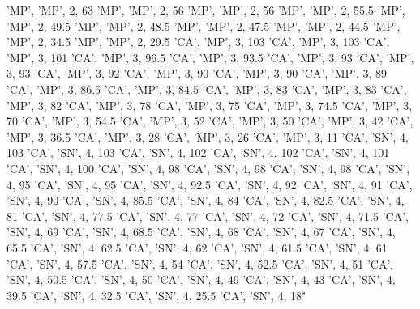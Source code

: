 \documentclass[
]{article}
\newenvironment{Shaded}{\begin{snugshade}}{\end{snugshade}}
\newcommand{\StringTok}[1]{\textcolor[rgb]{0.31,0.60,0.02}{#1}}
\begin{document}
\begin{Shaded}
\begin{Highlighting}[]
\StringTok{ 'MP', 'MP', 2, 63}
\StringTok{ 'MP', 'MP', 2, 56}
\StringTok{ 'MP', 'MP', 2, 56}
\StringTok{ 'MP', 'MP', 2, 55.5}
\StringTok{ 'MP', 'MP', 2, 49.5}
\StringTok{ 'MP', 'MP', 2, 48.5}
\StringTok{ 'MP', 'MP', 2, 47.5}
\StringTok{ 'MP', 'MP', 2, 44.5}
\StringTok{ 'MP', 'MP', 2, 34.5}
\StringTok{ 'MP', 'MP', 2, 29.5}
\StringTok{ 'CA', 'MP', 3, 103}
\StringTok{ 'CA', 'MP', 3, 103}
\StringTok{ 'CA', 'MP', 3, 101}
\StringTok{ 'CA', 'MP', 3, 96.5}
\StringTok{ 'CA', 'MP', 3, 93.5}
\StringTok{ 'CA', 'MP', 3, 93}
\StringTok{ 'CA', 'MP', 3, 93}
\StringTok{ 'CA', 'MP', 3, 92}
\StringTok{ 'CA', 'MP', 3, 90}
\StringTok{ 'CA', 'MP', 3, 90}
\StringTok{ 'CA', 'MP', 3, 89}
\StringTok{ 'CA', 'MP', 3, 86.5}
\StringTok{ 'CA', 'MP', 3, 84.5}
\StringTok{ 'CA', 'MP', 3, 83}
\StringTok{ 'CA', 'MP', 3, 83}
\StringTok{ 'CA', 'MP', 3, 82}
\StringTok{ 'CA', 'MP', 3, 78}
\StringTok{ 'CA', 'MP', 3, 75}
\StringTok{ 'CA', 'MP', 3, 74.5}
\StringTok{ 'CA', 'MP', 3, 70}
\StringTok{ 'CA', 'MP', 3, 54.5}
\StringTok{ 'CA', 'MP', 3, 52}
\StringTok{ 'CA', 'MP', 3, 50}
\StringTok{ 'CA', 'MP', 3, 42}
\StringTok{ 'CA', 'MP', 3, 36.5}
\StringTok{ 'CA', 'MP', 3, 28}
\StringTok{ 'CA', 'MP', 3, 26}
\StringTok{ 'CA', 'MP', 3, 11}
\StringTok{ 'CA', 'SN', 4, 103}
\StringTok{ 'CA', 'SN', 4, 103}
\StringTok{ 'CA', 'SN', 4, 102}
\StringTok{ 'CA', 'SN', 4, 102}
\StringTok{ 'CA', 'SN', 4, 101}
\StringTok{ 'CA', 'SN', 4, 100}
\StringTok{ 'CA', 'SN', 4, 98}
\StringTok{ 'CA', 'SN', 4, 98}
\StringTok{ 'CA', 'SN', 4, 98}
\StringTok{ 'CA', 'SN', 4, 95}
\StringTok{ 'CA', 'SN', 4, 95}
\StringTok{ 'CA', 'SN', 4, 92.5}
\StringTok{ 'CA', 'SN', 4, 92}
\StringTok{ 'CA', 'SN', 4, 91}
\StringTok{ 'CA', 'SN', 4, 90}
\StringTok{ 'CA', 'SN', 4, 85.5}
\StringTok{ 'CA', 'SN', 4, 84}
\StringTok{ 'CA', 'SN', 4, 82.5}
\StringTok{ 'CA', 'SN', 4, 81}
\StringTok{ 'CA', 'SN', 4, 77.5}
\StringTok{ 'CA', 'SN', 4, 77}
\StringTok{ 'CA', 'SN', 4, 72}
\StringTok{ 'CA', 'SN', 4, 71.5}
\StringTok{ 'CA', 'SN', 4, 69}
\StringTok{ 'CA', 'SN', 4, 68.5}
\StringTok{ 'CA', 'SN', 4, 68}
\StringTok{ 'CA', 'SN', 4, 67}
\StringTok{ 'CA', 'SN', 4, 65.5}
\StringTok{ 'CA', 'SN', 4, 62.5}
\StringTok{ 'CA', 'SN', 4, 62}
\StringTok{ 'CA', 'SN', 4, 61.5}
\StringTok{ 'CA', 'SN', 4, 61}
\StringTok{ 'CA', 'SN', 4, 57.5}
\StringTok{ 'CA', 'SN', 4, 54}
\StringTok{ 'CA', 'SN', 4, 52.5}
\StringTok{ 'CA', 'SN', 4, 51}
\StringTok{ 'CA', 'SN', 4, 50.5}
\StringTok{ 'CA', 'SN', 4, 50}
\StringTok{ 'CA', 'SN', 4, 49}
\StringTok{ 'CA', 'SN', 4, 43}
\StringTok{ 'CA', 'SN', 4, 39.5}
\StringTok{ 'CA', 'SN', 4, 32.5}
\StringTok{ 'CA', 'SN', 4, 25.5}
\StringTok{ 'CA', 'SN', 4, 18"}


\end{Highlighting}
\end{Shaded}
\end{document}
